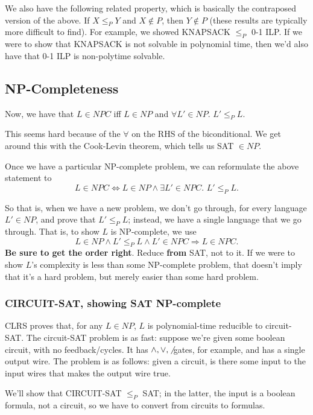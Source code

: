 \documentclass{article}
\begin{document}
We also have the following related property, which is basically the
contraposed version of the above.
If $X\leq_P Y$ and
$X\not\in P$, then $Y\not\in P$ (these results are typically more difficult
to find).
For example, we showed KNAPSACK $\leq_P$ 0-1 ILP. If we were to show that
KNAPSACK is not solvable in polynomial time, then we'd also have that 0-1 ILP
is non-polytime solvable.


\subsection{NP-Completeness}

Now, we have that $L\in NPC$ iff $L\in NP$ and 
$\forall L'\in NP.\,\,L' \leq_P L$.

This seems hard because of the $\forall$ on the RHS of the biconditional.
We get around this with the Cook-Levin theorem, which tells us SAT $\in NP$.

Once we have a particular NP-complete problem, we can reformulate the
above statement to
$$
L\in NPC \Leftrightarrow
L\in NP \wedge
\exists L'\in NPC.\,\, L' \leq_P L.
$$

So that is, when we have a new problem, we don't go through, for every language
$L'\in NP$, and prove that $L' \leq_P L$; instead, we have a single language
that we go through.
That is, to show $L$ is NP-complete, we use
$$
L\in NP \wedge L' \leq_P L \wedge L' \in NPC \Rightarrow L \in NPC.
$$
\textbf{Be sure to get the order right}.
Reduce \textbf{from} SAT, not to it.
If we were to show $L$'s complexity is less than some NP-complete problem,
that doesn't imply that it's a hard problem, but merely easier than some
hard problem.


\subsubsection{CIRCUIT-SAT, showing SAT NP-complete}

CLRS proves that, for any $L\in NP$, $L$ is polynomial-time reducible to 
circuit-SAT.
The circuit-SAT problem is as fast: suppose we're given some boolean circuit,
with no feedback/cycles. It has $\wedge,\vee,\not$ gates, for example, and
has a single output wire.
The problem is as follows: given a circuit, is there some input to the
input wires that makes the output wire true.

We'll show that CIRCUIT-SAT $\leq_P$ SAT; in the latter, the input is a 
boolean formula, not a circuit, so we have to convert from circuits
to formulas.
\end{document}
